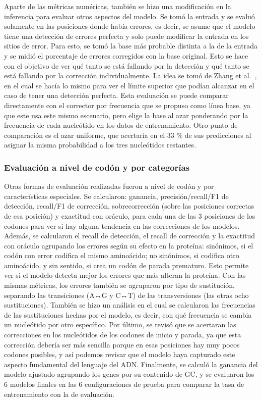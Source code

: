 \documentclass[sigconf,nonacm]{acmart}
\begin{document}
Aparte de las métricas numéricas, también se hizo una modificación en la inferencia para evaluar otros aspectos del modelo. Se tomó la entrada y se evaluó solamente en las posiciones donde había errores, es decir, se asume que el modelo tiene una detección de errores perfecta y solo puede modificar la entrada en los sitios de error. Para esto, se tomó la base más probable distinta a la de la entrada y se midió el porcentaje de errores corregidos con la base original. Esto se hace con el objetivo de ver qué tanto se está fallando por la detección y qué tanto se está fallando por la corrección individualmente. La idea se tomó de Zhang et al.~\cite{zhang2020spelling}, en el cual se hacía lo mismo para ver el límite superior que podían alcanzar en el caso de tener una detección perfecta. Esta evaluación se puede comparar directamente con el corrector por frecuencia que se propuso como línea base, ya que este usa este mismo escenario, pero elige la base al azar ponderando por la frecuencia de cada nucleótido en los datos de entrenamiento. Otro punto de comparación es el azar uniforme, que acertaría en el 33 \% de sus predicciones al asignar la misma probabilidad a los tres nucleótidos restantes.

\subsubsection{Evaluación a nivel de codón y por categorías}\label{sec:categorias}

Otras formas de evaluación realizadas fueron a nivel de codón y por características especiales. Se calcularon: ganancia, precisión/recall/F1 de detección, recall/F1 de corrección, sobrecorrección (sobre las posiciones correctas de esa posición) y exactitud con oráculo, para cada una de las 3 posiciones de los codones para ver si hay alguna tendencia en las correcciones de los modelos. Además, se calcularon el recall de detección, el recall de corrección y la exactitud con oráculo agrupando los errores según su efecto en la proteína: sinónimos, si el codón con error codifica el mismo aminoácido; no sinónimos, si codifica otro aminoácido, y sin sentido, si crea un codón de parada prematuro. Esto permite ver si el modelo detecta mejor los errores que más alteran la proteína. Con las mismas métricas, los errores también se agruparon por tipo de sustitución, separando las transiciones (A↔G y C↔T) de las transversiones (las otras ocho sustituciones). También se hizo un análisis en el cual se calcularon las frecuencias de las sustituciones hechas por el modelo, es decir, con qué frecuencia se cambia un nucleótido por otro específico. Por último, se revisó que se acertaran las correcciones en los nucleótidos de los codones de inicio y parada, ya que esta corrección debería ser más sencilla porque en esas posiciones hay muy pocos codones posibles, y así podemos revisar que el modelo haya capturado este aspecto fundamental del lenguaje del ADN. Finalmente, se calculó la ganancia del modelo ajustado agrupando los genes por su contenido de GC, y se evaluaron los 6 modelos finales en las 6 configuraciones de prueba para comparar la tasa de entrenamiento con la de evaluación.
\end{document}
